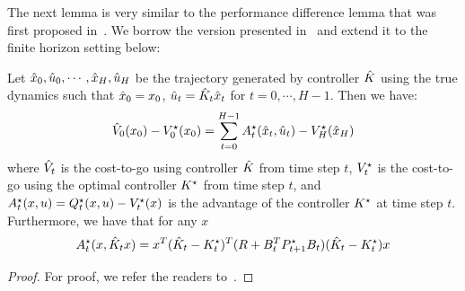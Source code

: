 The next lemma is very similar to the performance difference lemma that was
first proposed in~\cite{kakade2002approximately}. We borrow the version presented
in~\cite{fazel18} and extend it to the finite horizon setting below:
\begin{lemma}
  \label{lemma:performance-difference}
  Let $\hat{x}_0,
  \hat{u}_0, \cdots, \hat{x}_H, \hat{u}_H$ be the trajectory generated by
  controller
  $\hat{K}$ using the true dynamics such that $\hat{x}_0 = x_0$, $\hat{u}_t = \hat{K}_t\hat{x}_t$ for
  $t=0, \cdots, H-1$. Then
  we have:
  \begin{equation}
    \label{eq:2}
    \hat{V}_0(x_0) - V^\star_0(x_0) = \sum_{t=0}^{H-1} A^\star_t(\hat{x}_t, \hat{u}_t) - V^\star_H(\hat{x}_H)
  \end{equation}
  where $\hat{V}_t$ is the cost-to-go using controller $\hat{K}$ from time
  step $t$, $V^\star_t$ is the cost-to-go using the optimal controller $K^\star$ from time
  step $t$, and $A^\star_t(x, u) = Q^\star_t(x, u) - V^\star_t(x)$ is the advantage of
  the controller $K^\star$ at time step $t$. Furthermore, we have that for any $x$
  \begin{equation*}
    A^\star_t(x, \hat{K}_tx) = x^T(\hat{K}_t - K^\star_t)^T(R + B_t^TP^\star_{t+1}B_t)
    (\hat{K}_t - K^\star_t)x
  \end{equation*}
\end{lemma}
\begin{proof}
  For proof, we refer the readers to~\cite{fazel18}.
\end{proof}

